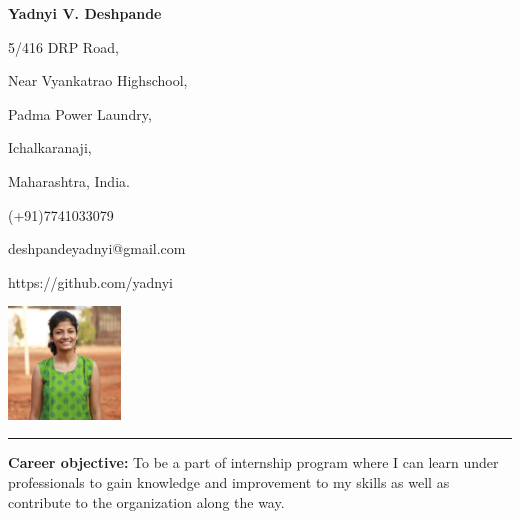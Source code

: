 \documentclass[a4paper,11pt]{article}
\begin{document}
	\begin{flushleft}
	 	\begin{Huge}
			\textbf{Yadnyi V. Deshpande}
		\end{Huge}
	\end{flushleft}

		\begin{minipage}[b]{0.4\textwidth}
			\raggedright
			5/416 DRP Road,\par
			Near Vyankatrao Highschool,\par
			Padma Power Laundry, \par
			Ichalkaranaji,\par
			Maharashtra, India.
		\end{minipage}%
		\begin{minipage}[b]{0.3\textwidth}
			\raggedright
			\begin{large}
				(+91)7741033079\par
				\centering
				\raggedright
				deshpandeyadnyi@gmail.com\par
				\centering  
				\raggedright
				https://github.com/yadnyi\par
			\end{large}
		\end{minipage}%
		\begin{minipage}[b]{0.3\textwidth}
			\centering
			\includegraphics[width = 30mm, height = 30mm]{yadnyi.JPG}
		\end{minipage}%
		
\noindent\rule{18.59cm}{0.4pt}	

\begin{minipage}[t]{1\textwidth}
			\raggedright\smallskip
			\begin{Large}
				\textbf{Career objective:}\medskip\linebreak%
				{\small To be a part of internship program where I can learn under professionals to gain knowledge and improvement to my skills as well as contribute to the organization along the way.}\linebreak%
			\end{Large}
		\end{minipage}%
		\vspace{0.35cm}
\end{document}
